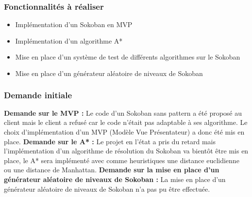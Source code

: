 \documentclass[a4paper,12pt]{article} %
\begin{document}
\subsubsection{Fonctionnalités à réaliser}
\noindent
\begin{itemize}
\item Implémentation d'un Sokoban en MVP
\item Implémentation d'un algorithme A*
\item Mise en place d'un système de test de différents algorithmes sur le Sokoban
\item Mise en place d'un générateur aléatoire de niveaux de Sokoban
\newline
\end{itemize} 




\subsubsection{Demande initiale}
\noindent
\textbf{Demande sur le MVP :}
\newline\newline
Le code d'un Sokoban sans pattern a été proposé au client mais le client a refusé car le code n'était pas adaptable à ses algorithme.
\newline
Le choix d'implémentation d'un MVP (Modèle Vue Présentateur) a donc été mis en place.
\newline\newline
\textbf{Demande sur le A* :}
\newline\newline
Le projet en l'état a pris du retard mais l'implémentation d'un algorithme de résolution du Sokoban va bientôt être mis en place, le A* sera implémenté avec comme heuristiques une distance euclidienne ou une distance de Manhattan.
\newline\newline
\textbf{Demande sur la mise en place d'un générateur aléatoire de niveaux de Sokoban :}
\newline\newline
La mise en place d'un générateur aléatoire de niveaux de Sokoban n'a pas pu être effectuée.
%
\end{document}

